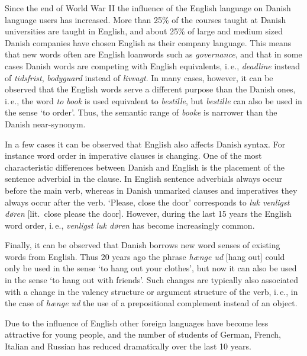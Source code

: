 \begin{multicols}{2}
Since the end of World War II the influence of the English language on Danish language users has increased. More than 25\% of the courses taught at Danish universities are taught in English, and about 25\% of large and medium sized Danish companies have chosen English as their company language.   This means that new words often are English loanwords such as {\it governance}, and that in some cases Danish words are competing with English equivalents, i.\,e., {\it deadline} instead of {\it tidsfrist}, {\it bodyguard} instead of {\it livvagt}. In many cases, however, it can be observed that the English words serve a different purpose than the Danish ones, i.\,e., the word {\it to book} is used equivalent to {\it bestille},  but {\it bestille} can also be used in the sense `to order'. Thus, the semantic range of {\it booke} is narrower than the Danish near-synonym. 

In a few cases it can be observed that English also affects Danish syntax. For instance word order in imperative clauses is changing. One of the most characteristic differences between Danish and English is the placement of the sentence adverbial in the clause. In English sentence adverbials always occur before the main verb, whereas in Danish unmarked clauses and imperatives they always occur after the verb. `Please, close the door' corresponds to {\it luk venligst d\o ren} [lit.\ close please the door]. However, during the last 15 years the English word order, i.\,e.,  {\it venligst luk d\o ren} has become increasingly common. 

Finally, it can be observed that Danish borrows new word senses of existing words from English. Thus 20 years ago the phrase {\it h\ae nge ud} [hang out]  could only be used in the sense `to hang out your clothes', but now it can also be used in the sense `to hang out with friends'. Such changes are typically also associated with a change in the valency structure or argument structure of the verb, i.\,e., in the case of {\it h\ae nge ud} the use of a prepositional complement instead of an object.


Due to the influence of English other foreign languages have become less attractive for young people, and the number of students of German, French, Italian and Russian has reduced dramatically over the last 10 years. 


\end{multicols}
